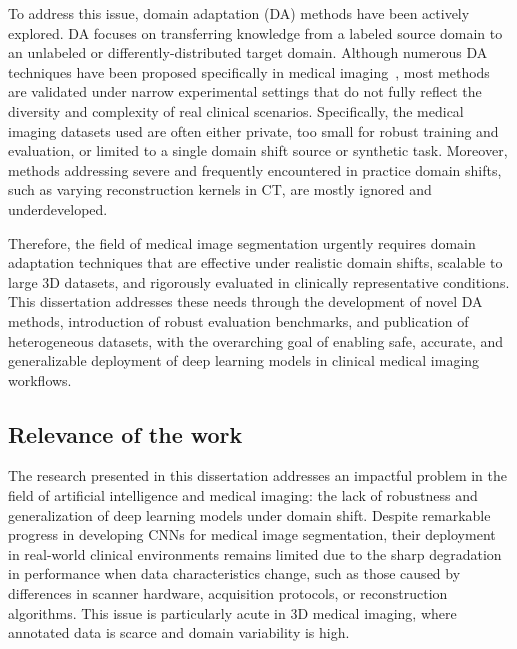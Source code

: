 To address this issue, domain adaptation (DA) methods have been actively explored. DA focuses on transferring knowledge from a labeled source domain to an unlabeled or differently-distributed target domain. Although numerous DA techniques have been proposed specifically in medical imaging~\cite{gulrajani2020search,uda_survey_2020,zhuang2020comprehensive,peng2018visda,zhang2021empirical}, most methods are validated under narrow experimental settings that do not fully reflect the diversity and complexity of real clinical scenarios. Specifically, the medical imaging datasets used are often either private, too small for robust training and evaluation, or limited to a single domain shift source or synthetic task. Moreover, methods addressing severe and frequently encountered in practice domain shifts, such as varying reconstruction kernels in CT, are mostly ignored and underdeveloped.

Therefore, the field of medical image segmentation urgently requires domain adaptation techniques that are effective under realistic domain shifts, scalable to large 3D datasets, and rigorously evaluated in clinically representative conditions. This dissertation addresses these needs through the development of novel DA methods, introduction of robust evaluation benchmarks, and publication of heterogeneous datasets, with the overarching goal of enabling safe, accurate, and generalizable deployment of deep learning models in clinical medical imaging workflows.


\subsection*{Relevance of the work}

The research presented in this dissertation addresses an impactful problem in the field of artificial intelligence and medical imaging: the lack of robustness and generalization of deep learning models under domain shift. Despite remarkable progress in developing CNNs for medical image segmentation, their deployment in real-world clinical environments remains limited due to the sharp degradation in performance when data characteristics change, such as those caused by differences in scanner hardware, acquisition protocols, or reconstruction algorithms. This issue is particularly acute in 3D medical imaging, where annotated data is scarce and domain variability is high.

